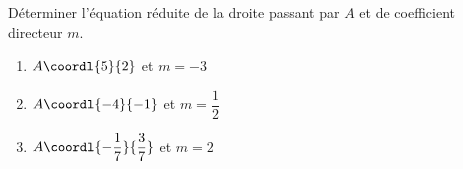 \begin{exo}{}
	Déterminer l'équation réduite de la droite passant par $A$ et de coefficient directeur $m$.
	\begin{enumerate}
		\item $A\coordl{5}{2}$ et $m = -3$
		\item $A\coordl{-4}{-1}$ et $m = \dfrac{1}{2}$
		\item $A\coordl{-\dfrac{1}{7}}{\dfrac{3}{7}}$ et $m = 2$
	\end{enumerate}
\end{exo}

